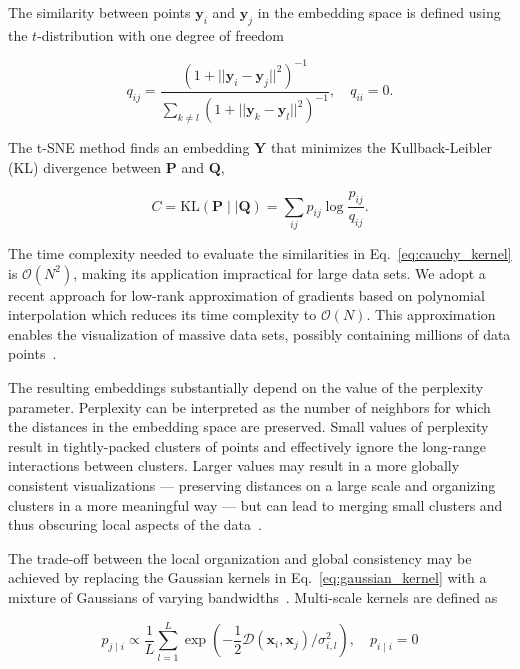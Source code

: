 \documentclass[runningheads]{llncs}
\begin{document}
The similarity between points $\mathbf{y}_i$ and $\mathbf{y}_j$ in the
embedding space is defined using the $t$-distribution with one degree of
freedom

\begin{equation}
q_{ij} = \frac{\left ( 1 + || \mathbf{y}_i - \mathbf{y}_j ||^2 \right )^{-1}}{\sum_{k \neq l}\left ( 1 + || \mathbf{y}_k - \mathbf{y}_l ||^2 \right )^{-1}},
\quad q_{ii} = 0.
\label{eq:cauchy_kernel}
\end{equation}

The t-SNE method finds an embedding $\mathbf{Y}$ that minimizes the
Kullback-Leibler (KL) divergence between $\mathbf{P}$ and $\mathbf{Q}$,

\begin{equation}
C = \text{KL}(\mathbf{P} \mid \mid \mathbf{Q}) = \sum_{ij} p_{ij} \log \frac{p_{ij}}{q_{ij}}.
\label{eq:kl_divergence}
\end{equation}

The time complexity needed to evaluate the similarities in
Eq.~\ref{eq:cauchy_kernel} is $\mathcal{O}(N^2)$, making its application
impractical for large data sets. We adopt a recent approach for low-rank
approximation of gradients based on polynomial interpolation which reduces its
time complexity to $\mathcal{O}(N)$. This approximation enables the
visualization of massive data sets, possibly containing millions of data
points~\cite{Linderman2019}.

The resulting embeddings substantially depend on the value of the perplexity
parameter. Perplexity can be interpreted as the number of neighbors for which
the distances in the embedding space are preserved. Small values of perplexity
result in tightly-packed clusters of points and effectively ignore the
long-range interactions between clusters. Larger values may result in a more
globally consistent visualizations --- preserving distances on a large scale and
organizing clusters in a more meaningful way --- but can lead to merging small
clusters and thus obscuring local aspects of the data~\cite{Kobak2019}.

The trade-off between the local organization and global consistency may be
achieved by replacing the Gaussian kernels in Eq.~\ref{eq:gaussian_kernel} with
a mixture of Gaussians of varying bandwidths~\cite{Lee2015}. Multi-scale kernels
are defined as

\begin{equation}
p_{j \mid i} \propto \frac{1}{L} \sum_{l=1}^{L} \exp \left ( - \frac{1}{2} \mathcal{D}(\mathbf{x}_i, \mathbf{x}_j ) / \sigma_{i,l}^2 \right ), \quad p_{i \mid i} = 0
\label{eq:multiscale}
\end{equation}
\end{document}
